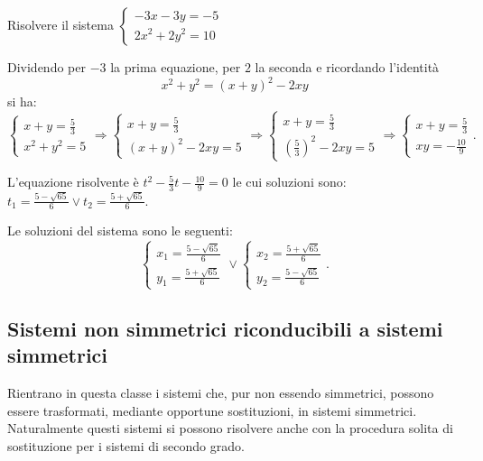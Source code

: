 \begin{esempio}{}{}
Risolvere il sistema 
\(\left\{\begin{array}{l}{-3x-3y=-5}\\{2x^2+2y^2=10}\end{array}\right.\)

Dividendo per \(-3\) la prima equazione, per \(2\) la seconda e ricordando 
l'identità 
\[x^2+y^2=(x+y)^2-2{xy}\] 
si ha: 
\[ \left\{\begin{array}{l}{x+y=\frac 5 3}\\
{x^2+y^2=5}\end{array}\right.
\Rightarrow \left\{\begin{array}{l}{x+y=\frac 5 3}\\
{(x+y)^2-2{xy}=5}\end{array}\right.
\Rightarrow \left\{\begin{array}{l}{x+y=\frac 5 3}\\
{\left(\frac 5 3\right)^2-2{xy}=5}\end{array}\right.
\Rightarrow \left\{\begin{array}{l}{x+y=\frac 5 3}\\
{{xy}=-\frac{10} 9}\end{array}\right..\]

L'equazione risolvente è \(t^2-\frac 5 3t-\frac{10} 9=0\) le cui soluzioni sono: 
\(t_1=\frac{5-\sqrt{65}} 6\vee t_2=\frac{5+\sqrt{65}} 6\).

Le soluzioni del sistema sono le seguenti: 
\[\left\{\begin{array}{l}{x_1=\frac{5-\sqrt{65}} 6}\\{y_1=\frac{5+\sqrt{65}} 
6}\end{array}\right.\vee \left\{\begin{array}{l}{x_2=\frac{5+\sqrt{65}} 
6}\\{y_2=\frac{5-\sqrt{65}} 6}\end{array}\right..\]
\end{esempio}


\subsection{Sistemi non simmetrici riconducibili a sistemi simmetrici}
Rientrano in questa classe i sistemi che, pur non essendo simmetrici, possono 
essere trasformati, mediante opportune sostituzioni, in sistemi simmetrici. 
Naturalmente questi sistemi si possono risolvere anche con la procedura solita 
di sostituzione per i sistemi di secondo grado.

